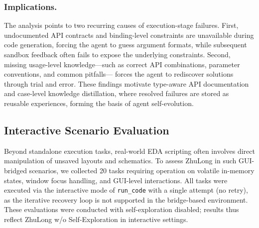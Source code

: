 \subsubsection{Implications.}

The analysis points to two recurring causes of execution-stage failures.
First, undocumented API contracts and binding-level constraints are
unavailable during code generation, forcing the agent to guess argument
formats, while subsequent sandbox feedback often fails to expose the
underlying constraints. Second, missing usage-level knowledge---such as
correct API combinations, parameter conventions, and common pitfalls---
forces the agent to rediscover solutions through trial and error. These
findings motivate type-aware API documentation and case-level knowledge
distillation, where resolved failures are stored as reusable experiences,
forming the basis of agent self-evolution.


\subsection{Interactive Scenario Evaluation}
\label{sec:exp-interactive}

Beyond standalone execution tasks, real-world EDA scripting often involves direct manipulation of unsaved layouts and schematics. To assess ZhuLong in such GUI-bridged scenarios, we collected 20 tasks requiring operation on volatile in-memory states, window focus handling, and GUI-level interactions. All tasks were executed via the interactive mode of \texttt{run\_code} with a single attempt (no retry), as the iterative recovery loop is not supported in the bridge-based environment. These evaluations were conducted with self-exploration disabled; results thus reflect ZhuLong w/o Self-Exploration in interactive settings.

